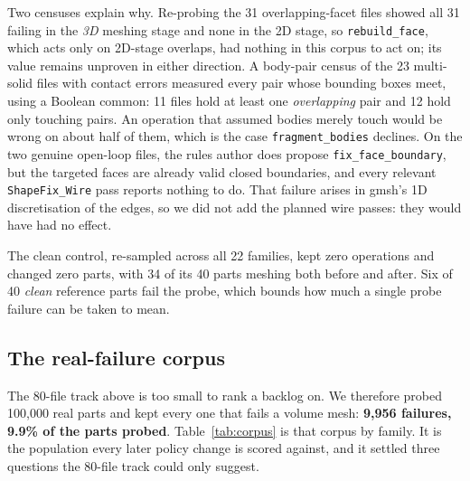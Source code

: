 \documentclass[10pt,onecolumn]{article}
\newcommand{\code}[1]{\texttt{\small #1}}
\begin{document}
Two censuses explain why. Re-probing the 31 overlapping-facet files showed all 31 failing in the
\emph{3D} meshing stage and none in the 2D stage, so \code{rebuild\_face}, which acts only on
2D-stage overlaps, had nothing in this corpus to act on; its value remains unproven in either
direction. A body-pair census of the 23 multi-solid files with contact errors measured every pair
whose bounding boxes meet, using a Boolean common: 11 files hold at least one
\emph{overlapping} pair and 12 hold only touching pairs. An operation that assumed bodies merely
touch would be wrong on about half of them, which is the case \code{fragment\_bodies} declines. On
the two genuine open-loop files, the rules author does propose \code{fix\_face\_boundary}, but the
targeted faces are already valid closed boundaries, and every relevant \code{ShapeFix\_Wire} pass
reports nothing to do. That failure arises in gmsh's 1D discretisation of the edges, so we did not
add the planned wire passes: they would have had no effect.

The clean control, re-sampled across all 22 families, kept zero operations and changed zero parts,
with 34 of its 40 parts meshing both before and after. Six of 40 \emph{clean} reference parts fail
the probe, which bounds how much a single probe failure can be taken to mean.

\subsection{The real-failure corpus}\label{sec:corpus}

The 80-file track above is too small to rank a backlog on. We therefore probed 100{,}000 real parts
and kept every one that fails a volume mesh: \textbf{9{,}956 failures, 9.9\% of the parts probed}.
Table~\ref{tab:corpus} is that corpus by family. It is the population every later policy change is
scored against, and it settled three questions the 80-file track could only suggest.
\end{document}
